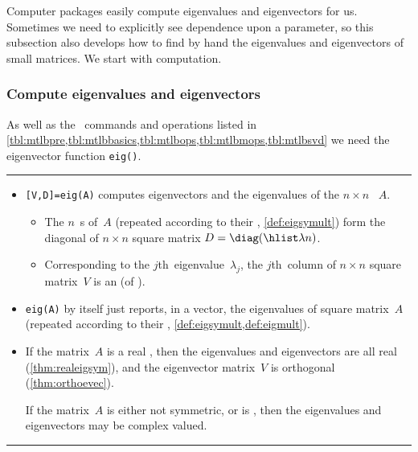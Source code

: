 Computer packages easily compute eigenvalues and eigenvectors for us.
Sometimes we need to explicitly see dependence upon a parameter, so this subsection also develops how to find by hand the eigenvalues and eigenvectors of small matrices.
We start with computation.


\subsubsection{Compute eigenvalues and eigenvectors}
\label{sec:cee}

\begin{table}
\caption{As well as the \script\ commands and operations listed in \cref{tbl:mtlbpre,tbl:mtlbbasics,tbl:mtlbops,tbl:mtlbmops,tbl:mtlbsvd}  we need the eigenvector function \texttt{eig()}.} \label{tbl:mtlbeig}
\hrule
\begin{minipage}{\linewidth}
\begin{itemize}
\item {}\verb|[V,D]=eig(A)| computes eigenvectors and the eigenvalues of the  \(n\times n\) ~\(A\).
\begin{itemize}
\item The \(n\)~s of~\(A\) (repeated according to their , \cref{def:eigsymult}) form the diagonal of \(n\times n\) square matrix \(D=\diag(\hlist\lambda n)\).
\item Corresponding to the \(j\)th~eigenvalue~\(\lambda_j\), the 
\(j\)th~column of \(n\times n\) square matrix~\(V\) is an 
 (of ).
\end{itemize}
\item \verb|eig(A)| by itself just reports, in a vector, the eigenvalues of square matrix~\(A\) (repeated according to their  , \cref{def:eigsymult,def:eigmult}).

\item If the matrix~\(A\) is a real , then the eigenvalues and eigenvectors are all real (\cref{thm:realeigsym}), and the eigenvector matrix~\(V\) is orthogonal (\cref{thm:orthoevec}).

If the matrix~\(A\) is either not symmetric, or is , then the eigenvalues and eigenvectors may be complex valued.

\end{itemize}
\end{minipage}
\hrule
\end{table}

